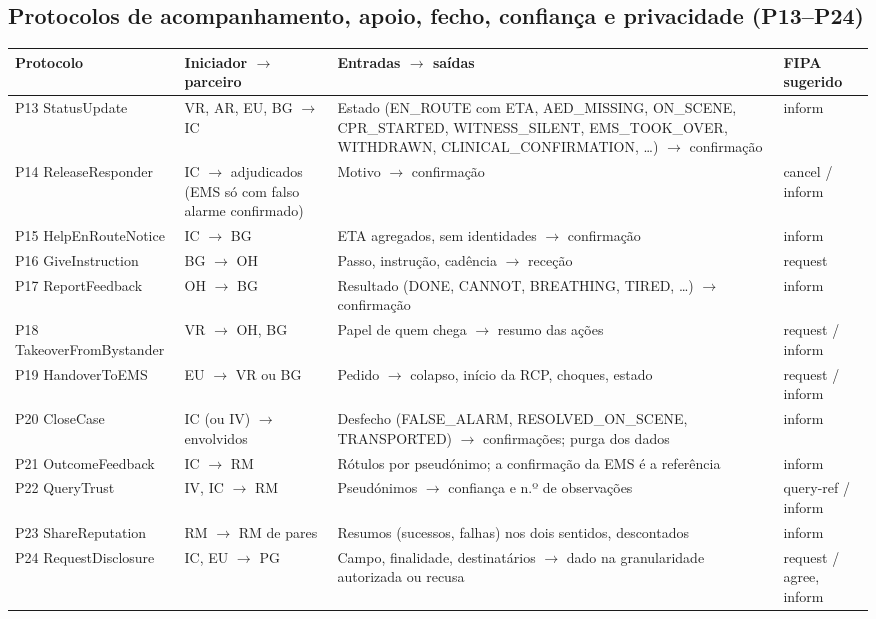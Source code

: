 \documentclass[10pt,a4paper]{article}
\begin{document}
\subsection{Protocolos de acompanhamento, apoio, fecho, confiança e privacidade (P13--P24)}\label{sec:protocolos2}

{\small
\begin{xltabular}{\linewidth}{@{}P{3.1cm}P{3.1cm}LP{2.3cm}@{}}
\toprule
Protocolo & Iniciador $\rightarrow$ parceiro & Entradas $\rightarrow$ saídas & FIPA sugerido \\
\midrule
\endhead
P13 StatusUpdate & VR, AR, EU, BG $\rightarrow$ IC & Estado (EN\_ROUTE com ETA, AED\_MISSING, ON\_SCENE, CPR\_STARTED, WITNESS\_SILENT, EMS\_TOOK\_OVER, WITHDRAWN, CLINICAL\_CONFIRMATION, \ldots) $\rightarrow$ confirmação & inform \\
P14 ReleaseResponder & IC $\rightarrow$ adjudicados (EMS só com falso alarme confirmado) & Motivo $\rightarrow$ confirmação & cancel / inform \\
P15 HelpEnRouteNotice & IC $\rightarrow$ BG & ETA agregados, sem identidades $\rightarrow$ confirmação & inform \\
P16 GiveInstruction & BG $\rightarrow$ OH & Passo, instrução, cadência $\rightarrow$ receção & request \\
P17 ReportFeedback & OH $\rightarrow$ BG & Resultado (DONE, CANNOT, BREATHING, TIRED, \ldots) $\rightarrow$ confirmação & inform \\
P18 TakeoverFromBystander & VR $\rightarrow$ OH, BG & Papel de quem chega $\rightarrow$ resumo das ações & request / inform \\
P19 HandoverToEMS & EU $\rightarrow$ VR ou BG & Pedido $\rightarrow$ colapso, início da RCP, choques, estado & request / inform \\
P20 CloseCase & IC (ou IV) $\rightarrow$ envolvidos & Desfecho (FALSE\_ALARM, RESOLVED\_ON\_SCENE, TRANSPORTED) $\rightarrow$ confirmações; purga dos dados & inform \\
P21 OutcomeFeedback & IC $\rightarrow$ RM & Rótulos por pseudónimo; a confirmação da EMS é a referência & inform \\
P22 QueryTrust & IV, IC $\rightarrow$ RM & Pseudónimos $\rightarrow$ confiança e n.º de observações & query-ref / inform \\
P23 ShareReputation & RM $\rightarrow$ RM de pares & Resumos (sucessos, falhas) nos dois sentidos, descontados & inform \\
P24 RequestDisclosure & IC, EU $\rightarrow$ PG & Campo, finalidade, destinatários $\rightarrow$ dado na granularidade autorizada ou recusa & request / agree, inform \\
\bottomrule
\end{xltabular}
}
\end{document}
